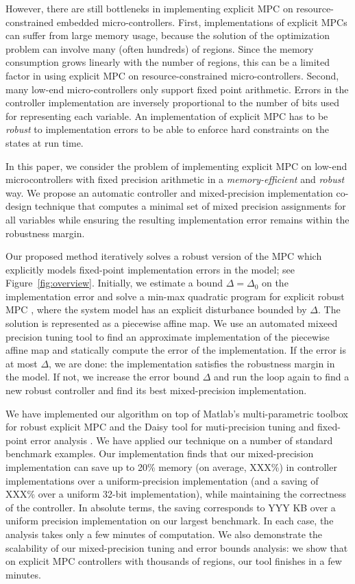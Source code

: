 However, there are still bottleneks in implementing explicit MPC on resource-constrained embedded micro-controllers.
First, implementations of explicit MPCs can suffer from large memory usage, because the solution of the optimization
problem can involve many (often hundreds) of regions.
Since the memory consumption grows linearly with the number of regions, 
this can be a limited factor in using explicit MPC on resource-constrained micro-controllers.
Second, many low-end micro-controllers only support fixed point arithmetic.
Errors in the controller implementation are inversely proportional to the number of bits used for representing each variable. 
An implementation of explicit MPC has to be \emph{robust} to 
implementation errors to be able to enforce hard constraints on the states at run time.

In this paper, we consider the problem of implementing explicit MPC on low-end microcontrollers with fixed precision arithmetic
in a \emph{memory-efficient} and \emph{robust} way.
We propose an automatic controller and mixed-precision implementation co-design technique that computes a minimal set of mixed
precision assignments for all variables while ensuring the resulting implementation error remains within the robustness margin.  


Our proposed method iteratively solves a robust version of the MPC which explicitly models fixed-point implementation errors
in the model; see Figure~\ref{fig:overview}.
Initially, we estimate a bound $\Delta = \Delta_0$ on the implementation error and solve a
min-max quadratic program for explicit robust MPC \cite{delaPea:2005}, where the system
model has an explicit disturbance bounded by $\Delta$.
The solution is represented as a piecewise affine map.
We use an automated mixeed precision tuning tool to find an approximate implementation of the piecewise affine
map and statically compute the error of the implementation.
If the error is at most $\Delta$, we are done: the implementation satisfies the robustness margin in the model.
If not, we increase the error bound $\Delta$ and run the loop again to find a new robust controller and find its best mixed-precision
implementation.

We have implemented our algorithm on top of Matlab's multi-parametric toolbox 
for robust explicit MPC \cite{Matlab-MPT?}
and the Daisy tool for muti-precision tuning and fixed-point error analysis \cite{Daisy}.
We have applied our technique on a number of standard benchmark examples.
Our implementation finds that our mixed-precision implementation can save up to 20\% memory (on average, XXX\%) in controller
implementations over a uniform-precision implementation (and a saving of XXX\% over a uniform 32-bit implementation), while
maintaining the correctness of the controller.
In absolute terms, the saving corresponds to YYY KB over a uniform precision implementation on our largest benchmark.
In each case, the analysis takes only a few minutes of computation.
We also demonstrate the scalability of our mixed-precision tuning and error bounds analysis:
we show that on explicit MPC controllers with thousands of regions, our tool finishes in a few minutes.

